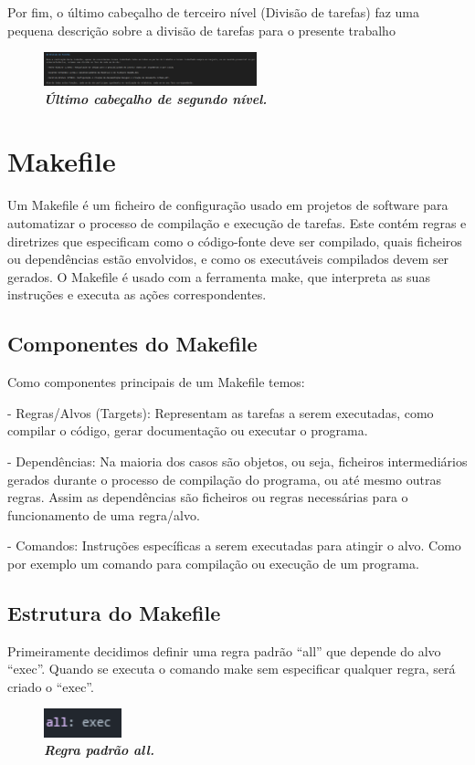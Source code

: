 \documentclass[a4wide]{report}
\begin{document}
{{{{\newpage
Por fim, o último cabeçalho de terceiro nível (Divisão de tarefas) faz uma pequena descrição sobre a divisão de tarefas para o presente trabalho

\begin{figure}[hbt]
    \centering
    \includegraphics[width=0.55\textwidth]{figura15.png}
    \caption{\textbf{\textit{Último cabeçalho de segundo nível.}}\label{fig:imagem}}
\end{figure}

\newpage
\chapter{Makefile}
\Large
Um Makefile é um ficheiro de configuração usado em projetos de software para automatizar o processo de compilação e execução de tarefas. Este contém regras e diretrizes que especificam como o código-fonte deve ser compilado, quais ficheiros ou dependências estão envolvidos, e como os executáveis compilados devem ser gerados. O Makefile é usado com a ferramenta make, que interpreta as suas instruções e executa as ações correspondentes.

\section{Componentes do Makefile}
\Large
Como componentes principais de um Makefile temos: 

- Regras/Alvos (Targets): Representam as tarefas a serem executadas, como compilar o código, gerar documentação ou executar o programa. 

- Dependências: Na maioria dos casos são objetos, ou seja, ficheiros intermediários gerados durante o processo de compilação do programa, ou até mesmo outras regras. Assim as dependências são ficheiros ou regras necessárias para o funcionamento de uma regra/alvo. 

- Comandos: Instruções específicas a serem executadas para atingir o alvo. Como por exemplo um comando para compilação ou execução de um programa. 

\section{Estrutura do Makefile}
\Large
Primeiramente decidimos definir uma regra padrão “all” que depende do alvo “exec”. Quando se executa o comando make sem especificar qualquer regra, será criado o “exec”.
\\
\begin{figure}[hbt]
    \centering
    \includegraphics[width=0.20\textwidth]{figura7.png}
    \caption{\textbf{\textit{Regra padrão all.}}\label{fig:imagem}}
\end{figure}

}}}}
\end{document}
